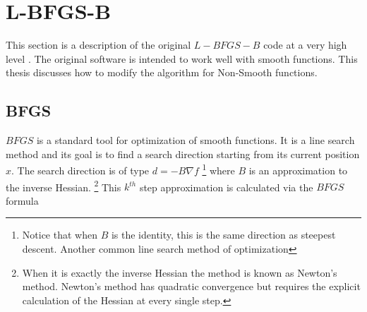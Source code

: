 



\chapter{L-BFGS-B}
\label{ChapterConstraints} %

This section is a description of the original $L-BFGS-B$ code at a very high level \citep{lbfgsbsoftware}. The original software is intended to work well with smooth functions. This thesis discusses how to modify the algorithm for Non-Smooth functions.

\section{BFGS}

$BFGS$ is a standard tool for optimization of smooth functions.\citep{nocedal} It is a line search method and its goal is to find a search direction starting from its current position $x$. The search direction is of type $d = -B \nabla f$ \footnote{Notice that when $B$ is the identity, this is the same direction as steepest descent. Another common line search method of optimization} where $B$ is an approximation to the inverse Hessian. \footnote{When it is exactly the inverse Hessian the method is known as Newton's method. Newton's method has quadratic convergence but requires the explicit calculation of the Hessian at every single step.} This $k^{th}$ step approximation is calculated via the $BFGS$ formula


